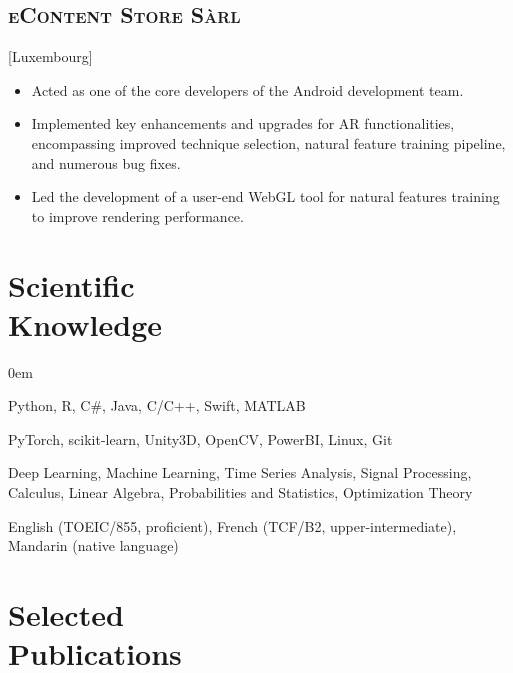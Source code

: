 \documentclass{mycv}
\begin{document}
\subsection{\scshape eContent Store S\`arl}[Luxembourg]

\begin{positions}
\end{positions}

\begin{itemize}
  \itemsep 0em
  \item Acted as one of the core developers of the Android development team.
  \item Implemented key enhancements and upgrades for AR functionalities, encompassing improved technique selection, natural feature training pipeline, and numerous bug fixes.
  \item Led the development of a user-end WebGL tool for natural features training to improve rendering performance.
\end{itemize}

\section{Scientific \\ Knowledge}

\begin{description}
  \itemsep 0em
    \item[Programming] Python, R, C\#, Java, C/C++, Swift, MATLAB
  \item[Frameworks \& Tools] PyTorch, scikit-learn, Unity3D, OpenCV, PowerBI, Linux, Git
  \item[Skills \& Expertise] Deep Learning, Machine Learning, Time Series Analysis, Signal Processing, Calculus, Linear Algebra, Probabilities and Statistics, Optimization Theory
  \item[Languages] English (TOEIC/855, proficient), French (TCF/B2, upper-intermediate), Mandarin (native language)
\end{description}

\section{Selected \\ Publications}

\end{document}
